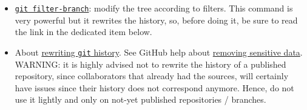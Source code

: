 \documentclass[a4paper,12pt,%
              final%
              ]{article}
\begin{document}
\begin{itemize}
  \item \href{https://git-scm.com/docs/git-filter-branch}{\texttt{git filter-branch}}: modify the tree according to filters. This command is very powerful but it rewrites the history, so, before doing it, be sure to read the link in the dedicated item below.
  \item About \href{https://git-scm.com/book/en/v2/Git-Tools-Rewriting-History}{rewriting \texttt{git} history}. See GitHub help about \href{https://docs.github.com/en/authentication/keeping-your-account-and-data-secure/removing-sensitive-data-from-a-repository}{removing sensitive data}. WARNING: it is highly advised not to rewrite the history of a published repository, since collaborators that already had the sources, will certainly have issues since their history does not correspond anymore. Hence, do not use it lightly and only on not-yet published repositories / branches.

\end{itemize}
\end{document}
